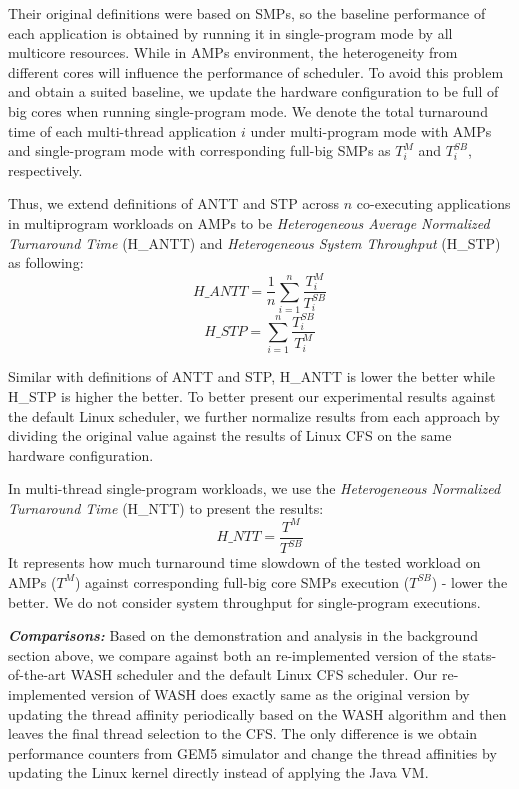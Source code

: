 \documentclass[sigplan,review,anonymous]{acmart}\settopmatter{printfolios=true,printccs=false,printacmref=false}
\begin{document}
Their original definitions were based on SMPs, so the baseline performance of each application is obtained by running it in single-program mode by all multicore resources. While in AMPs environment, the heterogeneity from different cores will influence the performance of scheduler. To avoid this problem and obtain a suited baseline, we update the hardware configuration to be full of big cores when running single-program mode. We denote the total turnaround time of each multi-thread application $i$ under multi-program mode with AMPs and single-program mode with corresponding full-big SMPs as $T^{M}_i$ and $T^{SB}_i$, respectively.

Thus, we extend definitions of ANTT and STP across $n$ co-executing applications in multiprogram workloads on AMPs to be {\it Heterogeneous Average Normalized Turnaround Time} (H\_ANTT) and {\it Heterogeneous System Throughput} (H\_STP) as following:
$$ H\_ANTT = \frac{1}{n}\sum^{n}_{i=1}\frac{T^{M}_i}{T^{SB}_i}$$
$$ H\_STP = \sum^{n}_{i=1}\frac{T^{SB}_i}{T^{M}_i}$$

Similar with definitions of ANTT and STP, H\_ANTT is lower the better while H\_STP is higher the better. To better present our experimental results against the default Linux scheduler, we further  normalize results from each approach by dividing the original value against the results of Linux CFS on the same hardware configuration.

In multi-thread single-program workloads, we use the {\it Heterogeneous Normalized Turnaround Time} (H\_NTT) to present the results:
$$ H\_NTT = \frac{T^{M}}{T^{SB}}$$
It represents how much turnaround time slowdown of the tested workload on AMPs ($T^{M}$) against corresponding full-big core SMPs execution ($T^{SB}$) - lower the better. We do not consider system throughput for single-program executions.


\textbf{\textit{Comparisons:}}
Based on the demonstration and analysis in the background section above, we compare against both an re-implemented version of the stats-of-the-art WASH scheduler and the default Linux CFS scheduler. Our re-implemented version of WASH does exactly same as the original version by updating the thread affinity periodically based on the WASH algorithm and then leaves the final thread selection to the CFS. The only difference is we obtain performance counters from GEM5 simulator and change the thread affinities by updating the Linux kernel directly instead of applying the Java VM. 
\end{document}
